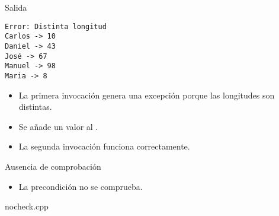 

\begin{frame}[t,fragile]{Salida}
\begin{lstlisting}[style=terminal]
Error: Distinta longitud
Carlos -> 10
Daniel -> 43
José -> 67
Manuel -> 98
Maria -> 8
\end{lstlisting}
\begin{itemize}
  \item La primera invocación genera una excepción porque las longitudes son distintas.
  \item Se añade un valor al .
  \item La segunda invocación funciona correctamente.
\end{itemize}
\end{frame}


\begin{frame}{Ausencia de comprobación}
\begin{itemize}
  \item La precondición no se comprueba.
\end{itemize}
\pause
\begin{block}{nocheck.cpp}
\end{block}
\end{frame}


